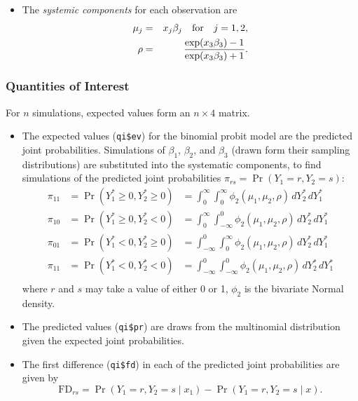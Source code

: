 \begin{itemize}
\item The \emph{systemic components} for each observation are 
  \begin{eqnarray*}
    \mu_j & = & x_{j} \beta_j \quad {\rm for} \quad j=1,2, \\
    \rho & = & \frac{\exp(x_3 \beta_3) - 1}{\exp(x_3 \beta_3) + 1}.
\end{eqnarray*}

\end{itemize}

\subsubsection{Quantities of Interest}
For $n$ simulations, expected values form an $n \times 4$
matrix.  
\begin{itemize}
\item The expected values ({\tt qi\$ev}) for the binomial probit model
  are the predicted joint probabilities. Simulations of $\beta_1$,
  $\beta_2$, and $\beta_3$ (drawn form their sampling distributions)
  are substituted into the systematic components, to find simulations
  of the predicted joint probabilities $\pi_{rs}=\Pr(Y_1=r, Y_2=s)$:
\begin{eqnarray*}
\pi_{11} &= \Pr(Y_1^* \geq 0 , Y_2^* \geq 0) &= \int_0^{\infty}
\int_0^{\infty} \phi_2 (\mu_1, \mu_2, \rho) \, dY_2^*\, dY_1^* \\
\pi_{10} &= \Pr(Y_1^* \geq 0 , Y_2^* < 0)  &= \int_0^{\infty}
\int_{-\infty}^{0} \phi_2 (\mu_1, \mu_2, \rho) \, dY_2^*\, dY_1^*\\
\pi_{01} &= \Pr(Y_1^* < 0 , Y_2^* \geq 0)  &= \int_{-\infty}^{0}
\int_0^{\infty} \phi_2 (\mu_1, \mu_2, \rho) \, dY_2^*\, dY_1^*\\
\pi_{11} &= \Pr(Y_1^* < 0 , Y_2^* < 0)  &= \int_{-\infty}^{0}
\int_{-\infty}^{0} \phi_2 (\mu_1, \mu_2, \rho) \, dY_2^*\, dY_1^*\\
\end{eqnarray*}
where $r$ and $s$ may take a value of either 0 or 1, $\phi_2$ is the
bivariate Normal density.
  
\item The predicted values ({\tt qi\$pr}) are draws from the
  multinomial distribution given the expected joint probabilities.  

\item The first difference ({\tt qi\$fd}) in each of the predicted joint
  probabilities are given by
  $$\textrm{FD}_{rs} = \Pr(Y_1=r, Y_2=s \mid x_1)-\Pr(Y_1=r, Y_2=s
  \mid x).$$
  

\end{itemize}
